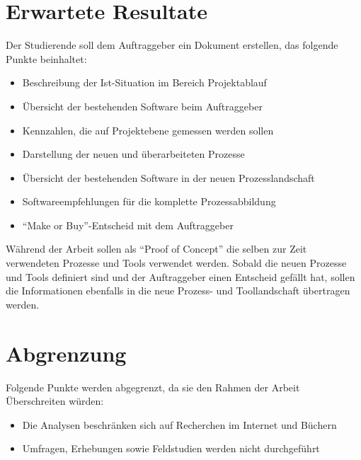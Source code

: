 \section{Erwartete Resultate}
Der Studierende soll dem Auftraggeber ein Dokument erstellen, das folgende 
Punkte beinhaltet: 

\begin{itemize}
    \item Beschreibung der Ist-Situation im Bereich Projektablauf
    \item Übersicht der bestehenden Software beim Auftraggeber
    \item Kennzahlen, die auf Projektebene gemessen werden sollen
    \item Darstellung der neuen und überarbeiteten Prozesse
    \item Übersicht der bestehenden Software in der neuen Prozesslandschaft
    \item Softwareempfehlungen für die komplette Prozessabbildung
    \item ``Make or Buy''-Entscheid mit dem Auftraggeber
\end{itemize}

Während der Arbeit sollen als ``Proof of Concept'' die selben zur Zeit verwendeten
Prozesse und Tools verwendet werden. Sobald die neuen Prozesse und Tools
definiert sind und der Auftraggeber einen Entscheid gefällt hat, sollen die
Informationen ebenfalls in die neue Prozess- und Toollandschaft übertragen werden.

\section{Abgrenzung}
Folgende Punkte werden abgegrenzt, da sie den Rahmen der Arbeit Überschreiten 
würden:

\begin{itemize}
    \item Die Analysen beschränken sich auf Recherchen im Internet und Büchern
    \item Umfragen, Erhebungen sowie Feldstudien werden nicht durchgeführt
\end{itemize}

